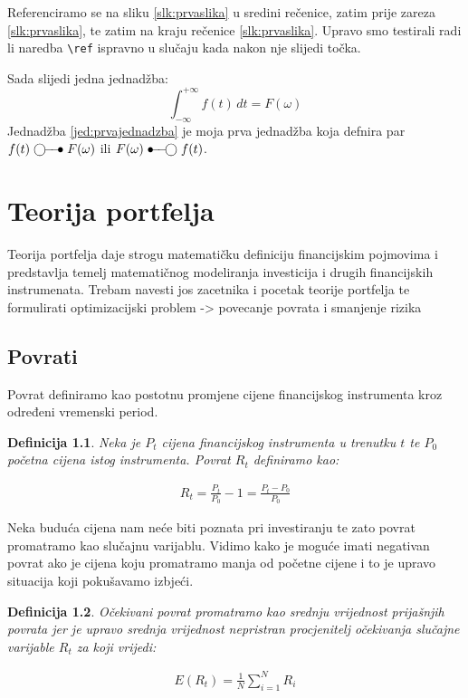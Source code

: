 \documentclass[zavrsnirad]{fer}
\newtheorem{definition}{Definicija}
\begin{document}
Referenciramo se na sliku \ref{slk:prvaslika} u sredini rečenice, zatim prije zareza \ref{slk:prvaslika}, te zatim na kraju rečenice \ref{slk:prvaslika}.
Upravo smo testirali radi li naredba \verb|\ref| ispravno u slučaju kada nakon nje slijedi točka.

Sada slijedi jedna jednadžba:
\begin{equation}
	\label{jed:prvajednadzba}
	\int_{-\infty}^{+\infty}f(t)\,dt=F(\omega)
\end{equation}
Jednadžba \eqref{jed:prvajednadzba} je moja prva jednadžba koja defnira par $f(t)\ufrek F(\omega)$ ili $F(\omega)\uvrem f(t)$.

\chapter{Teorija portfelja}
\label{pog:teorija_portelja}

Teorija portfelja daje strogu matematičku definiciju
financijskim pojmovima i predstavlja temelj matematičnog
modeliranja investicija i drugih financijskih instrumenata.
Trebam navesti jos zacetnika i pocetak teorije portfelja te formulirati
optimizacijski problem -> povecanje povrata i smanjenje rizika

\section{Povrati}
\label{sek:povrati}

Povrat definiramo kao postotnu promjene cijene financijskog
instrumenta kroz određeni vremenski period.

\begin{definition}
	Neka je $P_t$ cijena financijskog instrumenta u trenutku $t$ te
	$P_0$ početna cijena istog instrumenta. Povrat $R_t$ definiramo kao:
\end{definition}
\begin{align*}R_t = \frac{P_t}{P_0} - 1 = \frac{P_t - P_0}{P_0}
\end{align*}

\noindent Neka buduća cijena nam neće biti poznata pri investiranju te zato povrat promatramo kao slučajnu varijablu.
Vidimo kako je moguće imati negativan povrat ako je cijena koju promatramo
manja od početne cijene i to je upravo situacija koji pokušavamo izbjeći.
\begin{definition}
	Očekivani povrat promatramo kao srednju vrijednost prijašnjih
	povrata jer je upravo srednja vrijednost nepristran procjenitelj
	očekivanja slučajne varijable $R_t$ za koji vrijedi:
\end{definition}
\begin{align*}
	E(R_t) =\frac{1}{N} \sum_{i = 1}^{N} R_i
\end{align*}
\end{document}
